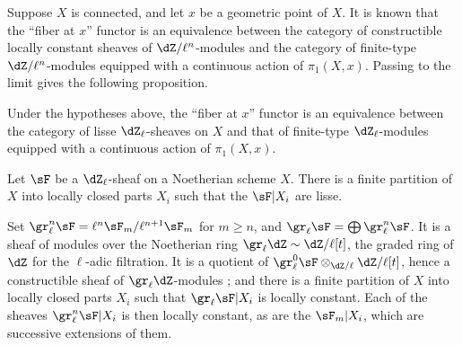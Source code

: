 Suppose $X$ is connected, and let $x$ be a geometric point of $X$. It is
known that the ``fiber at $x$'' functor is an equivalence between the
category of constructible locally constant sheaves of
$\dZ/\ell^n$-modules and the category of finite-type
$\dZ/\ell^n$-modules equipped with a continuous action of $\pi_1(X,x)$.
Passing to the limit gives the following proposition.






\begin{proposition_}\label{II:2-4}
Under the hypotheses above, the ``fiber at $x$'' functor is an equivalence
between the category of lisse $\dZ_\ell$-sheaves on $X$ and that of
finite-type $\dZ_\ell$-modules equipped with a continuous action of
$\pi_1(X,x)$.
\end{proposition_}






\begin{proposition_}\label{II:2-5}
Let $\sF$ be a $\dZ_\ell$-sheaf on a Noetherian scheme $X$. There is a finite
partition of $X$ into locally closed parts $X_i$ such that the $\sF|X_i$ are
lisse.
\end{proposition_}

Set $\gr_\ell^n\sF=\ell^n\sF_m/\ell^{n+1}\sF_m$ for $m\geqslant n$, and
$\gr_\ell\sF=\bigoplus \gr_\ell^n\sF$. It is a sheaf of modules over the
Noetherian ring $\gr_\ell\dZ\sim\dZ/\ell[t]$, the graded ring of $\dZ$ for the
$\ell$-adic filtration. It is a quotient of
$\gr_\ell^0\sF \otimes_{\dZ/\ell} \dZ/\ell[t]$, hence a constructible sheaf
of $\gr_\ell\dZ$-modules ; and there is a finite partition
of $X$ into locally closed parts $X_i$ such that
$\gr_\ell \sF|X_i$ is locally constant. Each of the sheaves
$\gr_\ell^n\sF|X_i$ is then locally constant, as are the $\sF_m|X_i$, which
are successive extensions of them.






\subsection{}\label{II:2-6}

